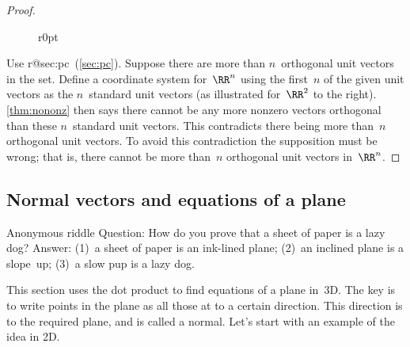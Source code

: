 \begin{proof} 
\begin{wrapfigure}r{0pt}
\end{wrapfigure}
Use %
\ifcsname r@sec:pc\endcsname\ (\cref{sec:pc})\fi.
Suppose there are more than \(n\)~orthogonal unit vectors in the set.
Define a coordinate system for~\(\RR^n\) using the first~\(n\) of the given unit vectors as the \(n\)~standard unit vectors 
(as illustrated for~\(\RR^2\) to the right).
\cref{thm:nononz} then says there cannot be any more nonzero vectors orthogonal than these \(n\)~standard unit vectors.
This contradicts there being more than~\(n\) orthogonal unit vectors.
To avoid this contradiction the supposition must be wrong; that is, there cannot be more than~\(n\) orthogonal unit vectors in~\(\RR^n\).
\par
\end{proof}








\subsection{Normal vectors and equations of a plane}
\label{sec:nvep}


\begin{quoted}{Anonymous riddle}
Question: How do you prove that a sheet of paper is a lazy dog?  Answer: (1)~a sheet of paper is an ink-lined plane; (2)~an inclined plane is a slope~up; (3)~a slow pup is a lazy dog.
\end{quoted}

This section uses the dot product to find equations of a plane in~3D.
The key is to write points in the plane as all those at  to a certain direction.  
This direction is  to the required plane, and is called a normal.
Let's start with an example of the idea in 2D.

